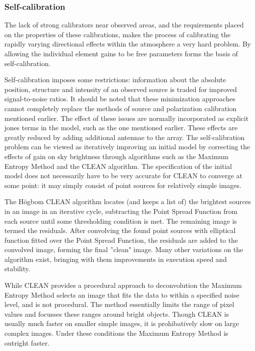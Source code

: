\documentclass[a4paper,10pt]{report}
\begin{document}
\subsubsection{Self-calibration}
 The lack of strong calibrators near observed areas, and the requirements placed on the properties of these calibrations, makes the process of calibrating the rapidly varying 
 directional effects within the atmosphere a very hard problem. By allowing the individual element gains to be free parameters forms the basis of self-calibration. 

 Self-calibration imposes some restrictions: information about the absolute position, structure and intensity of an observed source is traded
 for improved signal-to-noise ratios. It should be noted that these minimization approaches cannot completely replace the methods of source and polarization calibration mentioned earlier. 
 The effect of these issues are normally incorporated as explicit jones terms in the model, such as the one mentioned earlier. These effects are greatly reduced by adding additional 
 antennae to the array. The self-calibration problem can be viewed as iteratively improving an initial model by correcting the effects of gain on sky brightness through algorithms such as the Maximum Entropy Method
 and the CLEAN algorithm. The specification of the initial model does not necessarily have to be very accurate for CLEAN to converge at some point: it may simply 
 consist of point sources for relatively simple images.

 The H\"ogbom CLEAN algorithm locates (and keeps a list of) the brightest sources in an image in an iterative cycle, subtracting the Point Spread Function from each source until some 
 thresholding condition is met. The remaining image is termed the residuals. After convolving the found point sources with elliptical function fitted over the Point Spread Function, 
 the residuals are added to the convolved image, forming the final ''clean" image. Many other variations on the algorithm exist, bringing with them improvements in execution speed and 
 stability.

 While CLEAN provides a procedural approach to deconvolution the Maximum Entropy Method selects an image that fits the data to within a specified noise level, and is not procedural.
 The method essentially limits the range of pixel values and focusses these ranges around bright objects. Though CLEAN is usually much faster on smaller simple images, it is prohibatively slow 
 on large complex images. Under these conditions the Maximum Entropy Method is outright faster.
\end{document}
